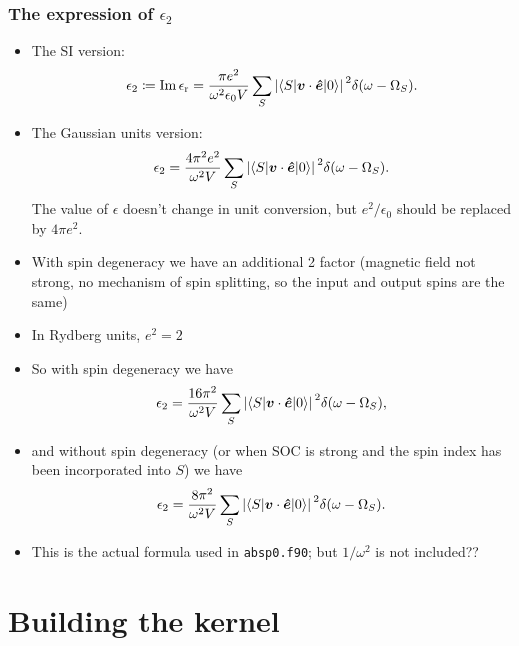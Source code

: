 \documentclass[t]{beamer}
\newcommand{\shortcode}[1]{\texttt{#1}}
\begin{document}
\begin{frame}[allowframebreaks]
\frametitle{The expression of $\epsilon_2$}

\begin{itemize}
    \item The SI version: 
    \begin{equation}
        \epsilon_2 \coloneqq \Im \epsilon_{\text{r}} = \frac{\pi e^2}{\omega^2 \epsilon_0 V} 
        \sum_S \abs*{\mel**{S}{\vb*{v} \cdot \vu*{e}}{0}}^2 \delta(\omega - \Omega_S).
    \end{equation}
    \item The Gaussian units version: 
    \begin{equation}
        \epsilon_2 = \frac{4 \pi^2 e^2}{\omega^2  V} 
        \sum_S \abs*{\mel**{S}{\vb*{v} \cdot \vu*{e}}{0}}^2 \delta(\omega - \Omega_S).
    \end{equation}
    The value of $\epsilon$ doesn't change in unit conversion, 
    but $e^2 / \epsilon_0$ should be replaced by $4 \pi e^2$. 
    \item With spin degeneracy we have an additional 2 factor 
    (magnetic field not strong, no mechanism of spin splitting, 
    so the input and output spins are the same)
    \item In Rydberg units, $e^2 = 2$
    \item So with spin degeneracy we have  
    \begin{equation}
        \epsilon_2 = \frac{16 \pi^2 }{\omega^2  V} 
        \sum_S \abs*{\mel**{S}{\vb*{v} \cdot \vu*{e}}{0}}^2 \delta(\omega - \Omega_S),
    \end{equation}
    \item  and without spin degeneracy 
    (or when SOC is strong and the spin index has been incorporated into $S$) we have 
    \begin{equation}
        \epsilon_2 = \frac{8 \pi^2 }{\omega^2  V} 
        \sum_S \abs*{\mel**{S}{\vb*{v} \cdot \vu*{e}}{0}}^2 \delta(\omega - \Omega_S).
    \end{equation}
    \item This is the actual formula used in \shortcode{absp0.f90}; 
    but $1 / \omega^2$ is not included??
\end{itemize}

\end{frame}

\section{Building the kernel}
\end{document}
